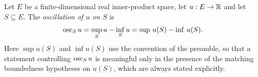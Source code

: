 \begin{definition}[Oscillation]
Let $E$ be a finite-dimensional real inner-product space, let $u:E\to\mathbb{R}$ and let
$S\subseteq E$. The \emph{oscillation of $u$ on $S$} is
\[
  \operatorname{osc}_Su=\sup_Su-\inf_Su
    =\sup\,u(S)-\inf\,u(S).
\]
Here $\sup u(S)$ and $\inf u(S)$ use the convention of the preamble, so that a
statement controlling $\operatorname{osc}_Su$ is meaningful only in the presence of the
matching boundedness hypotheses on $u(S)$, which are always stated explicitly.
\end{definition}
